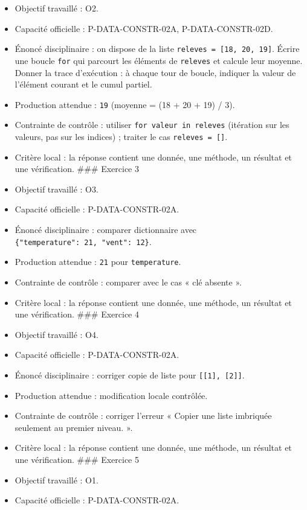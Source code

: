 \begin{itemize}
\item
  Objectif travaillé : O2.
\item
  Capacité officielle : P-DATA-CONSTR-02A, P-DATA-CONSTR-02D.
\item
  Énoncé disciplinaire : on dispose de la liste
  \texttt{releves\ =\ {[}18,\ 20,\ 19{]}}. Écrire une boucle
  \texttt{for} qui parcourt les éléments de \texttt{releves} et calcule
  leur moyenne. Donner la trace d'exécution : à chaque tour de boucle,
  indiquer la valeur de l'élément courant et le cumul partiel.
\item
  Production attendue : \texttt{19} (moyenne = (18 + 20 + 19) / 3).
\item
  Contrainte de contrôle : utiliser \texttt{for\ valeur\ in\ releves}
  (itération sur les valeurs, pas sur les indices) ; traiter le cas
  \texttt{releves\ =\ {[}{]}}.
\item
  Critère local : la réponse contient une donnée, une méthode, un
  résultat et une vérification. \#\#\# Exercice 3
\item
  Objectif travaillé : O3.
\item
  Capacité officielle : P-DATA-CONSTR-02A.
\item
  Énoncé disciplinaire : comparer dictionnaire avec
  \texttt{\{"temperature":\ 21,\ "vent":\ 12\}}.
\item
  Production attendue : \texttt{21} pour \texttt{temperature}.
\item
  Contrainte de contrôle : comparer avec le cas « clé absente ».
\item
  Critère local : la réponse contient une donnée, une méthode, un
  résultat et une vérification. \#\#\# Exercice 4
\item
  Objectif travaillé : O4.
\item
  Capacité officielle : P-DATA-CONSTR-02A.
\item
  Énoncé disciplinaire : corriger copie de liste pour
  \texttt{{[}{[}1{]},\ {[}2{]}{]}}.
\item
  Production attendue : modification locale contrôlée.
\item
  Contrainte de contrôle : corriger l'erreur « Copier une liste
  imbriquée seulement au premier niveau. ».
\item
  Critère local : la réponse contient une donnée, une méthode, un
  résultat et une vérification. \#\#\# Exercice 5
\item
  Objectif travaillé : O1.
\item
  Capacité officielle : P-DATA-CONSTR-02A.

\end{itemize}
